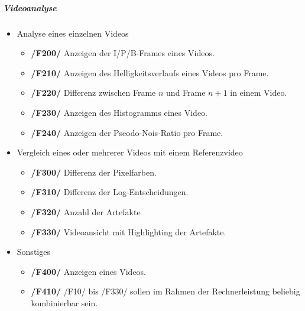 \subparagraph{Videoanalyse}
\begin{itemize}
	\item Analyse eines einzelnen Videos  
		\begin{itemize}
			\item \textbf{/F200/} Anzeigen der I/P/B-Frames eines Videos.
			\item \textbf{/F210/} Anzeigen des Helligkeitsverlaufs eines Videos pro Frame.
			\item \textbf{/F220/} Differenz zwischen Frame $n$ und Frame $n + 1$ in einem Video.	
			\item \textbf{/F230/} Anzeigen des Histogramms eines Video.
			\item \textbf{/F240/} Anzeigen der Pseodo-Nois-Ratio pro Frame.
		   \end{itemize} 
	\item Vergleich eines oder mehrerer Videos mit einem Referenzvideo
		\begin{itemize}
			\item \textbf{/F300/} Differenz der Pixelfarben.
			\item \textbf{/F310/} Differenz der Log-Entscheidungen.
			\item \textbf{/F320/} Anzahl der Artefakte
			\item \textbf{/F330/} Videoansicht mit Highlighting der Artefakte.
		\end{itemize}	
	\item Sonstiges
		\begin{itemize}
			\item \textbf{/F400/} Anzeigen eines Videos. 
			\item \textbf{/F410/} /F10/ bis /F330/ sollen im Rahmen der Rechnerleistung beliebig kombinierbar sein.
		\end{itemize}
\end{itemize}

